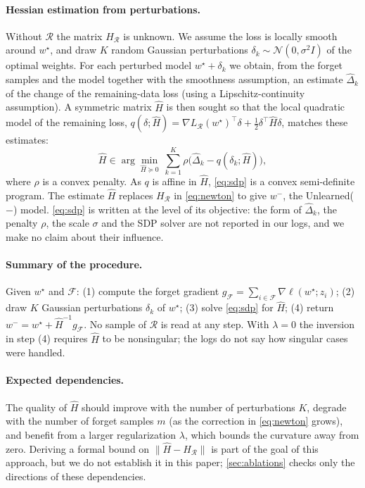 \documentclass[10pt,twocolumn,letterpaper]{article}
\begin{document}
\paragraph{Hessian estimation from perturbations.}
Without $\mathcal{R}$ the matrix $H_{\mathcal{R}}$ is unknown.
We assume the loss is locally smooth around $w^\star$, and draw $K$ random Gaussian perturbations $\delta_k\sim\mathcal{N}(0,\sigma^2 I)$ of the optimal weights.
For each perturbed model $w^\star+\delta_k$ we obtain, from the forget samples and the model together with the smoothness assumption, an estimate $\hat\Delta_k$ of the change of the remaining-data loss (using a Lipschitz-continuity assumption).
A symmetric matrix $\hat H$ is then sought so that the local quadratic model of the remaining loss, $q(\delta;\hat H)=\nabla L_{\mathcal{R}}(w^\star)^{\top}\delta+\tfrac12\delta^{\top}\hat H\delta$, matches these estimates:
\begin{equation}
  \hat H \in \arg\min_{\hat H\succeq 0}\ \sum_{k=1}^{K}\rho\big(\hat\Delta_k - q(\delta_k;\hat H)\big),
  \label{eq:sdp}
\end{equation}
where $\rho$ is a convex penalty.
As $q$ is affine in $\hat H$, \cref{eq:sdp} is a convex semi-definite program.
The estimate $\hat H$ replaces $H_{\mathcal{R}}$ in \cref{eq:newton} to give $w^{-}$, the Unlearned($-$) model.
\cref{eq:sdp} is written at the level of its objective: the form of $\hat\Delta_k$, the penalty $\rho$, the scale $\sigma$ and the SDP solver are not reported in our logs, and we make no claim about their influence.

\paragraph{Summary of the procedure.}
Given $w^\star$ and $\mathcal{F}$:
(1) compute the forget gradient $g_{\mathcal{F}}=\sum_{i\in\mathcal{F}}\nabla\ell(w^\star;z_i)$;
(2) draw $K$ Gaussian perturbations $\delta_k$ of $w^\star$;
(3) solve \cref{eq:sdp} for $\hat H$;
(4) return $w^{-}=w^\star+\hat H^{-1}g_{\mathcal{F}}$.
No sample of $\mathcal{R}$ is read at any step. With $\lambda=0$ the inversion in step (4) requires $\hat H$ to be nonsingular; the logs do not say how singular cases were handled.

\paragraph{Expected dependencies.}
The quality of $\hat H$ should improve with the number of perturbations $K$, degrade with the number of forget samples $m$ (as the correction in \cref{eq:newton} grows), and benefit from a larger regularization $\lambda$, which bounds the curvature away from zero.
Deriving a formal bound on $\lVert\hat H-H_{\mathcal{R}}\rVert$ is part of the goal of this approach, but we do not establish it in this paper; \cref{sec:ablations} checks only the directions of these dependencies.
\end{document}
